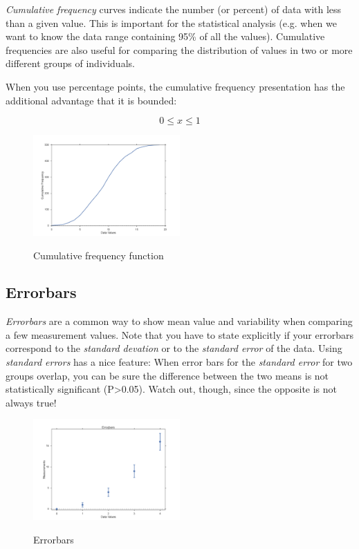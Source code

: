 \emph{Cumulative frequency} curves indicate the number (or percent) of data with less than a given value. This is important for the statistical analysis (e.g. when we want to know the data range containing 95\% of all the values). Cumulative frequencies
are also useful for comparing the distribution of values in two or more different groups of individuals.

When you use percentage points, the cumulative frequency presentation has the additional advantage that it is bounded:

\begin{equation*}
  0 \leq x \leq 1
\end{equation*}

\begin{figure}[ht]
  \centering
  \includegraphics[width=0.5\textwidth]{../Images/CumulativeFrequencyFunction.png}\\
  \caption{Cumulative frequency function}
\end{figure}

\subsection{Errorbars}

\emph{Errorbars} are a common way to show mean value and variability when comparing a few measurement values. Note that you have to state explicitly if your errorbars correspond to the \emph{standard devation} or to the \emph{standard error} of the data. Using \emph{standard errors} has a nice feature: When error bars for the \emph{standard error} for two groups overlap, you can be sure the difference between the two means is not statistically significant (P>0.05). Watch out, though, since the opposite is not always true!

\begin{figure}[ht]
  \centering
  \includegraphics[width=0.5\textwidth]{../Images/Errorbars.png}\\
  \caption{Errorbars}
\end{figure}


